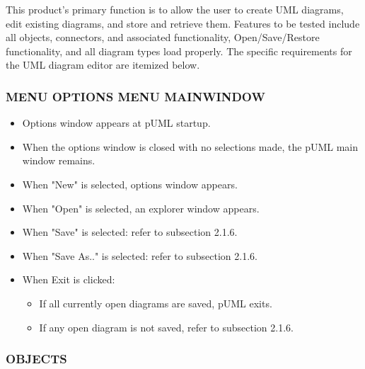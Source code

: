 \documentclass[twoside,letterpaper]{article}
\begin{document}
This product's primary function is to allow the user to create UML diagrams, edit existing diagrams, and store and retrieve them.
\newline Features to be tested include all objects, connectors, and associated functionality, Open/Save/Restore functionality, and all diagram types load properly. The specific requirements for the UML diagram editor are itemized below.

\bigskip

\subsubsection[MENU OPTIONS MENU MAINWINDOW]
{\bfseries MENU OPTIONS MENU MAINWINDOW} 
{
\begin{itemize}
\item Options window appears at pUML startup.
\item When the options window is closed with no selections made, the pUML main window remains.
\item When "New" is selected, options window appears.
\item When "Open" is selected, an explorer window appears.
\item When "Save" is selected: refer to subsection 2.1.6.
\item When "Save As.." is selected: refer to subsection 2.1.6.
\item When Exit is clicked:
\begin{itemize}
\item If all currently open diagrams are saved, pUML exits.
\item If any open diagram is not saved, refer to subsection 2.1.6.
\end{itemize}
\end{itemize}
\bigskip

\subsubsection[OBJECTS]{\bfseries OBJECTS} 

}
\end{document}
